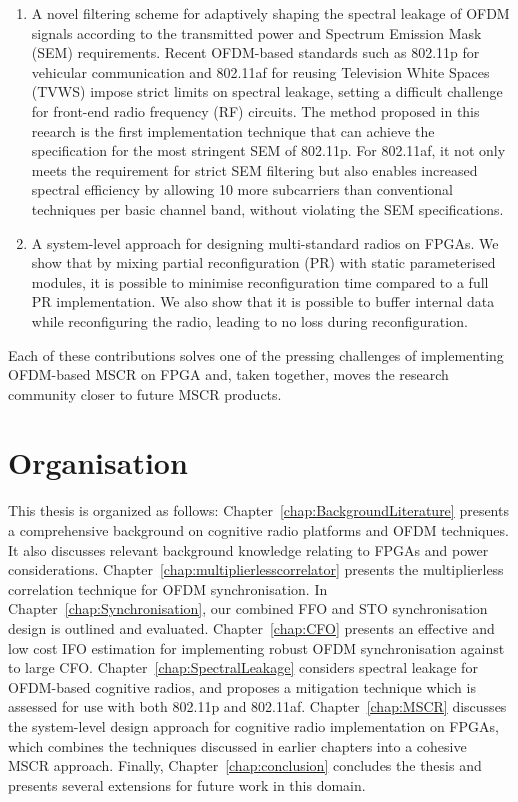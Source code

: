 \begin{enumerate}
\item A novel filtering scheme for adaptively shaping the spectral leakage of OFDM signals according to the transmitted power and Spectrum Emission Mask (SEM) requirements.
Recent OFDM-based standards such as 802.11p for vehicular communication and 802.11af for reusing Television White Spaces (TVWS) impose strict limits on spectral leakage, setting a difficult challenge for front-end radio frequency (RF) circuits.
The method proposed in this reearch is the first implementation technique that can achieve the specification for the most stringent SEM of 802.11p.
For 802.11af, it not only meets the requirement for strict SEM filtering but also enables increased spectral efficiency by allowing 10 more subcarriers than conventional techniques per basic channel band, without violating the SEM specifications.

\item A system-level approach for designing multi-standard radios on FPGAs.
We show that by mixing partial reconfiguration (PR) with static parameterised modules, it is possible to minimise reconfiguration time compared to a full PR implementation.
We also show that it is possible to buffer internal data while reconfiguring the radio, leading to no loss during reconfiguration.%
\end{enumerate}

Each of these contributions solves one of the pressing challenges of implementing OFDM-based MSCR on FPGA and, taken together, moves the research community closer to future MSCR products.

\section{Organisation}

This thesis is organized as follows:
Chapter~\ref{chap:BackgroundLiterature} presents a comprehensive background on cognitive radio platforms and OFDM techniques. It also discusses relevant background knowledge relating to FPGAs and power considerations. Chapter~\ref{chap:multiplierlesscorrelator} presents the multiplierless correlation technique for OFDM synchronisation. In Chapter~\ref{chap:Synchronisation}, our combined FFO and STO synchronisation design is outlined and evaluated. Chapter~\ref{chap:CFO} presents an effective and low cost IFO estimation for implementing robust OFDM synchronisation against to large CFO. Chapter~\ref{chap:SpectralLeakage} considers  spectral leakage for OFDM-based cognitive radios, and proposes a mitigation technique which is assessed for use with both 802.11p and 802.11af.
Chapter~\ref{chap:MSCR} discusses the system-level design approach for cognitive radio implementation on FPGAs, which combines the techniques discussed in earlier chapters into a cohesive MSCR approach.
Finally, Chapter~\ref{chap:conclusion} concludes the thesis and presents several extensions for future work in this domain.

